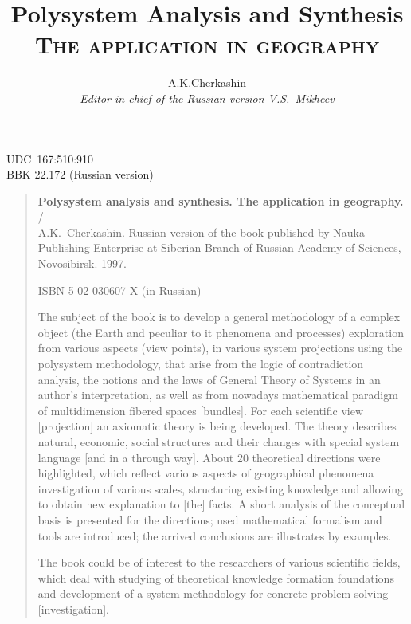 \documentclass[12pt,leqno]{book}
\title{Polysystem Analysis and Synthesis\\\textsc{\small{} The application in geography}  }
\author{A.K.Cherkashin  \\
{\small\em Editor in chief of the Russian version V.S.~Mikheev }}
\date{ }
\begin{document}
\maketitle
{}
\newpage{}
\pagestyle{empty}
\noindent{}UDC~167:510:910\\{}
BBK 22.172 (Russian version)
\vfill
\begin{quote}
\small{}
\textbf{Polysystem analysis and synthesis. The application in geography.} /\\{}
A.K.~Cherkashin. Russian version of the book published by Nauka Publishing Enterprise at Siberian Branch of Russian Academy of Sciences, Novosibirsk. 1997.

ISBN 5-02-030607-X (in Russian)

The subject of the book is to develop a general methodology of a complex object (the Earth and peculiar to it phenomena and processes) exploration from various aspects (view points), in various system projections using the polysystem methodology, that arise from the logic of contradiction analysis, the notions and the laws of General Theory of Systems in an author's interpretation, as well as from nowadays mathematical paradigm of multidimension fibered spaces [bundles]. For each scientific view [projection] an axiomatic theory is being developed. The theory describes natural, economic, social structures and their changes with special system language [and in a through way]. About 20 theoretical directions were highlighted, which reflect various aspects of geographical phenomena investigation of various scales, structuring existing knowledge and allowing to obtain new explanation to [the] facts. A short analysis of the conceptual basis is presented for the directions; used mathematical formalism and tools are introduced; the arrived conclusions are illustrates by examples.

The book could be of interest to the researchers of various scientific fields, which deal with studying of theoretical knowledge formation foundations and development of a system methodology for concrete problem solving [investigation].

\vspace{1em}


\end{quote}
\end{document}
